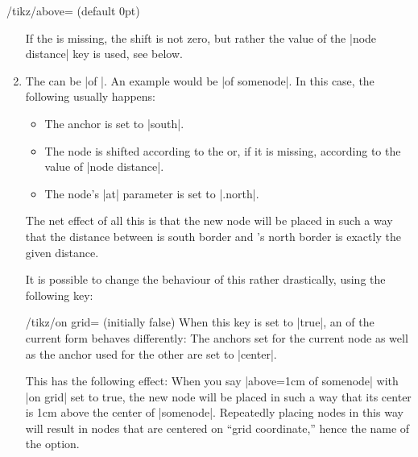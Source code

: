 \begin{key}{/tikz/above= (default 0pt)}
\begin{enumerate}
    If the  is missing, the shift is not zero, but
    rather the value of the |node distance| key is used, see below.
  \item The  can be |of |. An
    example would be |of somenode|. In this case, the following
    usually happens:
    \begin{itemize}
    \item The anchor is set to |south|.
    \item The node is shifted according to the 
      or, if it is missing, according to the value of |node distance|.
    \item The node's |at| parameter is set to |.north|.
    \end{itemize}
    The net effect of all this is that the new node will be placed in
    such a way that the distance between is south border and
    's north border is exactly the given distance.
\begin{codeexample}[]
\end{codeexample}
    It is possible to change the behaviour of this
     rather drastically, using the following key:
    \begin{key}{/tikz/on grid= (initially false)}
      When this key is set to |true|, an  of the
      current form behaves differently: The anchors set for the
      current node as well as the anchor used for the other  are set to |center|.

      This has the following effect: When you say
      |above=1cm of somenode| with |on grid| set to true, the new node
      will be placed in such a way that its center is 1cm above the
      center of |somenode|. Repeatedly placing nodes in this way will
      result in nodes that are centered on ``grid coordinate,'' hence
      the name of the option.
\begin{codeexample}[]
\end{codeexample}
\end{key}
\end{enumerate}
\end{key}
